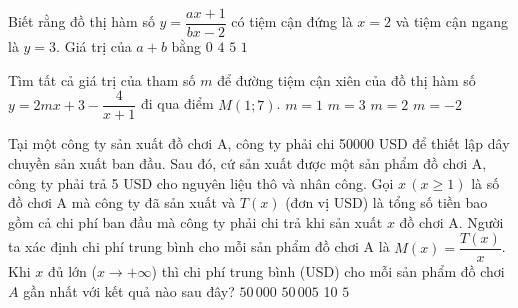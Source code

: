 \begin{ex}
 Biết rằng đồ thị hàm số $ y=\dfrac{ax+1}{bx-2}$ có tiệm cận đứng là $x=2$ và tiệm cận ngang là $y=3$. Giá trị của $a+b$ bằng
 \choice
 {$0$}
 {\True $4$}
 {$5$}
 {$1$}
\end{ex}
\begin{ex}
 Tìm tất cả giá trị của tham số $m$ để đường tiệm cận xiên của đồ thị hàm số $y=2mx+3-\dfrac{4}{x+1}$ đi qua điểm $M(1;7)$.
 \choice
 {$m=1$}
 {$m=3$}
 {\True $m=2$}
 {$m=-2$}
\end{ex}
\begin{ex}
 Tại một công ty sản xuất đồ chơi A, công ty phải chi 50000 USD để thiết lập dây chuyền sản xuất ban đầu. Sau đó, cứ sản xuất được một sản phẩm đồ chơi A, công ty phải trả 5 USD cho nguyên liệu thô và nhân công. Gọi $x\,(x \geq 1)$ là số đồ chơi A mà công ty đã sản xuất và $T(x)$ (đơn vị USD) là tổng số tiền bao gồm cả chi phí ban đầu mà công ty phải chi trả khi sản xuất $x$ đồ chơi A. Người ta xác định chi phí trung bình cho mỗi sản phẩm đồ chơi A là $M(x)=\dfrac{T(x)}{x}$. Khi $x$ đủ lớn ($x\to +\infty$) thì chi phí trung bình (USD) cho mỗi sản phẩm đồ chơi $A$ gần nhất với kết quả nào sau đây?
 \choice
 {$50\,000$}
 {$50\,005$}
 {10}
 {\True $5$}
\end{ex}
